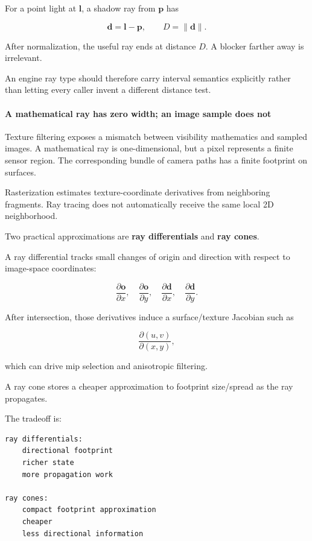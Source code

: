For a point light at \(\mathbf l\), a shadow ray from \(\mathbf p\) has

\[
\mathbf d=\mathbf l-\mathbf p,
\qquad
D=\|\mathbf d\|.
\]

After normalization, the useful ray ends at distance \(D\). A blocker farther away is irrelevant.

An engine ray type should therefore carry interval semantics explicitly rather than letting every caller invent a different distance test.

\paragraph{A mathematical ray has zero width; an image sample does not}\label{a-mathematical-ray-has-zero-width-an-image-sample-does-not}

Texture filtering exposes a mismatch between visibility mathematics and sampled images. A mathematical ray is one-dimensional, but a pixel represents a finite sensor region. The corresponding bundle of camera paths has a finite footprint on surfaces.

Rasterization estimates texture-coordinate derivatives from neighboring fragments. Ray tracing does not automatically receive the same local 2D neighborhood.

Two practical approximations are \textbf{ray differentials} and \textbf{ray cones}.

A ray differential tracks small changes of origin and direction with respect to image-space coordinates:

\[
\frac{\partial \mathbf o}{\partial x},
\quad
\frac{\partial \mathbf o}{\partial y},
\quad
\frac{\partial \mathbf d}{\partial x},
\quad
\frac{\partial \mathbf d}{\partial y}.
\]

After intersection, those derivatives induce a surface/texture Jacobian such as

\[
\frac{\partial(u,v)}{\partial(x,y)},
\]

which can drive mip selection and anisotropic filtering.

A ray cone stores a cheaper approximation to footprint size/spread as the ray propagates.

The tradeoff is:

\begin{verbatim}
ray differentials:
    directional footprint
    richer state
    more propagation work

ray cones:
    compact footprint approximation
    cheaper
    less directional information
\end{verbatim}

